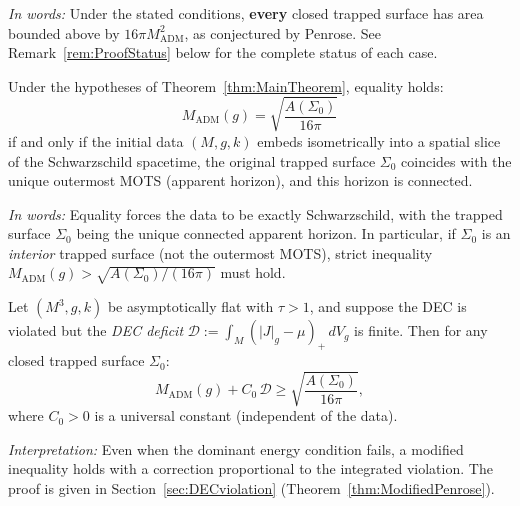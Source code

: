 \noindent\emph{In words:} Under the stated conditions, \textbf{every} closed trapped surface has area bounded above by $16\pi M_{\mathrm{ADM}}^2$, as conjectured by Penrose. See Remark~\ref{rem:ProofStatus} below for the complete status of each case.

\begin{theorem}\label{thm:MainB}
Under the hypotheses of Theorem~\ref{thm:MainTheorem}, equality holds:
\[
M_{\mathrm{ADM}}(g) = \sqrt{\frac{A(\Sigma_0)}{16\pi}}
\]
if and only if the initial data $(M, g, k)$ embeds isometrically into a spatial slice of the Schwarzschild spacetime, the original trapped surface $\Sigma_0$ coincides with the unique outermost MOTS (apparent horizon), and this horizon is connected.
\end{theorem}

\noindent\emph{In words:} Equality forces the data to be exactly Schwarzschild, with the trapped surface $\Sigma_0$ being the unique connected apparent horizon. In particular, if $\Sigma_0$ is an \emph{interior} trapped surface (not the outermost MOTS), strict inequality $M_{\mathrm{ADM}}(g) > \sqrt{A(\Sigma_0)/(16\pi)}$ must hold.

\begin{theorem}\label{thm:MainC}
Let $(M^3, g, k)$ be asymptotically flat with $\tau > 1$, and suppose the DEC is violated but the \emph{DEC deficit} $\mathcal{D} := \int_M (|J|_g - \mu)_+ \, dV_g$ is finite. Then for any closed trapped surface $\Sigma_0$:
\begin{equation}
    M_{\mathrm{ADM}}(g) + C_0 \, \mathcal{D} \ge \sqrt{\frac{A(\Sigma_0)}{16\pi}},
\end{equation}
where $C_0 > 0$ is a universal constant (independent of the data).
\end{theorem}

\noindent\emph{Interpretation:} Even when the dominant energy condition fails, a modified inequality holds with a correction proportional to the integrated violation. The proof is given in Section~\ref{sec:DECviolation} (Theorem~\ref{thm:ModifiedPenrose}).

